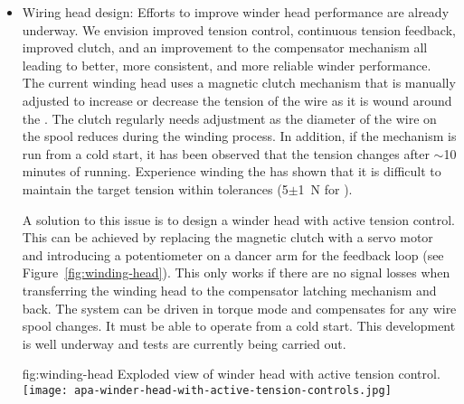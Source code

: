 \begin{itemize}

\item Wiring head design: Efforts to improve winder head performance are already underway. We envision improved tension control, continuous tension feedback, improved clutch, and an improvement to the compensator mechanism all leading to better, more consistent, and more reliable winder performance.  The current winding head uses a magnetic clutch mechanism that is manually adjusted to increase or decrease the tension of the wire as it is wound around the . The clutch regularly needs adjustment as the diameter of the wire on the spool reduces during the winding process. In addition, if the mechanism is run from a cold start, it has been observed that the tension changes after $\sim$10 minutes of running. Experience winding the   has shown that it is difficult to maintain the target tension within tolerances (5$\pm$\SI{1}{N} for ).

A solution to this issue is to design a winder head with active tension control. This can be achieved by replacing the magnetic clutch with a servo motor and introducing a potentiometer on a dancer arm for the feedback loop (see Figure~\ref{fig:winding-head}). This only works if there are no signal losses when transferring the winding head to the compensator latching mechanism and back. The system can be driven in torque mode and compensates for any wire spool changes. It must be able to operate from a cold start. This development is well underway and tests are currently being carried out.

\begin{dunefigure}{fig:winding-head}
{Exploded view of winder head with active tension control.}
\texttt{[image: apa-winder-head-with-active-tension-controls.jpg]}
\end{dunefigure}


\end{itemize}
